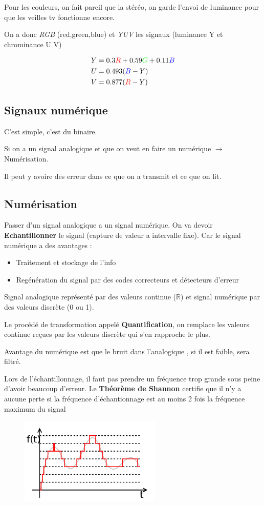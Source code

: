 			Pour les couleurs, on fait pareil que la stéréo, on garde l'envoi de luminance pour que les veilles tv fonctionne encore.
			
			On a donc \textit{RGB} (red,green,blue) et \textit{YUV} les signaux (luminance Y et chrominance U V)
			
			\begin{align*} 
				Y &= 0.3\textcolor{red}{R} + 0.59\textcolor{green}{G} + 0.11\textcolor{blue}{B}\\
				U &= 0.493(\textcolor{blue}{B}-Y)\\
				V &= 0.877(\textcolor{red}{R}-Y)
			\end{align*}
	\subsection{Signaux numérique}
		C'est simple, c'est du binaire.
		
		Si on a un signal analogique et que on veut en faire un numérique $\rightarrow$ Numérisation.
		
		Il peut y avoire des erreur dans ce que on a transmit et ce que on lit.
		
	\subsection{Numérisation}
		Passer d'un signal analogique a un signal numérique. On va devoir \textbf{Echantillonner} le signal (capture de valeur a intervalle fixe). Car le signal numérique a des avantages :
		\begin{itemize}
			\item Traitement et stockage de l'info
			\item Regénération du signal par des codes correcteurs et détecteurs d'erreur
		\end{itemize}
		
		Signal analogique représenté par des valeurs continue  ($\mathbb{R}$)	et signal numérique par des valeurs discrète (0 ou 1).
		
		Le procédé de transformation appelé \textbf{Quantification}, on remplace les valeurs continue reçues par les valeurs discrète qui s'en rapproche le plus.
		
		Avantage du numérique est que le bruit dans l'analogique , si il est faible, sera filtré.
		
		Lors de l'échantillonnage, il faut pas prendre un fréquence trop grande sous peine d'avoir beaucoup d'erreur. Le \textbf{Théorème de Shannon} certifie que il n'y a aucune perte si la fréquence d'échantionnage est au moins 2 fois la fréquence maximum du signal
		
		\begin{figure}[H]
			\centering
			\includegraphics[width=0.6\textwidth]{img/Quantification.png}
		\end{figure}		
		
		
		